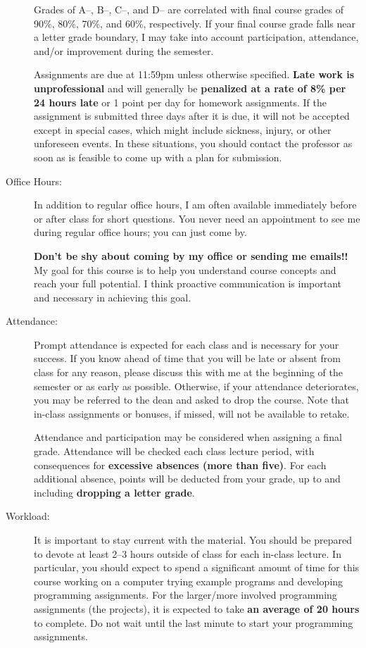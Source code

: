 \documentclass [letterpaper,11pt]{article}
\begin{document}
\begin{description}
Grades of A--, B--, C--, and D-- are correlated with final course grades of 90\%, 80\%,
70\%, and 60\%, respectively.  If your final course grade falls near a letter grade boundary,
I may take into account participation, attendance, and/or improvement during the semester.

Assignments are due at 11:59pm unless otherwise specified.  \textbf{Late work is unprofessional} and will generally be \textbf{penalized at a rate of 8\% per 24 hours late} or 1 point per day for homework assignments.  If the assignment is submitted three days after it is due, it will not be accepted except in special cases, which might include sickness, injury, or other unforeseen events. In these situations, you should contact the professor as soon as is feasible to come up with a plan for submission.

\item[Office Hours:]
In addition to regular office hours, I am often available immediately before or after class for 
short questions.  You never need an appointment to see me during regular office hours; you
can just come by.  

\textbf{Don't be shy about coming by my office or sending me emails!!}  My goal for this course is to help you understand course concepts and reach your full potential. I think proactive communication is important and necessary in achieving this goal.


\item[Attendance:]
Prompt attendance is expected for each class and is necessary for your success. If you know ahead of time that you will be late or
absent from class for any reason, please discuss this with me at the beginning of the semester
or as early as possible. Otherwise, if your attendance deteriorates, you may be referred to the dean and asked to drop the course. Note that in-class assignments or bonuses, if missed, will not be available to retake.

Attendance and participation may be considered when assigning a final grade.
Attendance will be checked each class lecture period, with consequences for \textbf{excessive absences (more than five)}.  For each additional absence, points will be deducted from your grade, up to and including \textbf{dropping a letter grade}.


\item[Workload:]
It is important to stay current with the material.  You should be prepared to devote at least 2--3 hours outside of class for each in-class lecture.  In particular, you should expect to spend a significant amount of time for this course working on a computer trying example programs and developing programming assignments. For the larger/more involved programming assignments (the projects), it is expected to take \textbf{an average of 20 hours} to complete. Do not wait until the last minute to start your programming assignments. 


\end{description}
\end{document}
